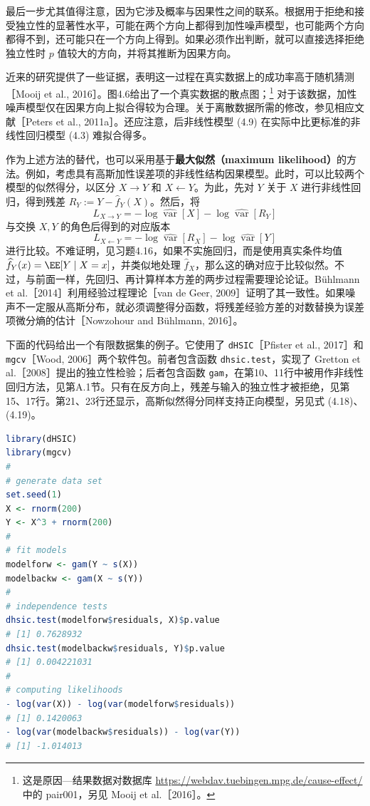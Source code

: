 最后一步尤其值得注意，因为它涉及概率与因果性之间的联系。根据用于拒绝和接受独立性的显著性水平，可能在两个方向上都得到加性噪声模型，也可能两个方向都得不到，还可能只在一个方向上得到。如果必须作出判断，就可以直接选择拒绝独立性时 $p$ 值较大的方向，并将其推断为因果方向。

近来的研究提供了一些证据，表明这一过程在真实数据上的成功率高于随机猜测［Mooij et al., 2016］。图4.6给出了一个真实数据的散点图；\footnote{这是原因—结果数据对数据库 \url{https://webdav.tuebingen.mpg.de/cause-effect/} 中的 pair001，另见 Mooij et al.［2016］。}
对于该数据，加性噪声模型仅在因果方向上拟合得较为合理。关于离散数据所需的修改，参见相应文献［Peters et al., 2011a］。还应注意，后非线性模型 (4.9) 在实际中比更标准的非线性回归模型 (4.3) 难拟合得多。



作为上述方法的替代，也可以采用基于\textbf{最大似然（maximum likelihood）}的方法。例如，考虑具有高斯加性误差项的非线性结构因果模型。此时，可以比较两个模型的似然得分，以区分 $X\to Y$ 和 $X\leftarrow Y$。为此，先对 $Y$ 关于 $X$ 进行非线性回归，得到残差 $R_Y:=Y-\widehat f_Y(X)$。然后，将
\begin{equation}
 L_{X\to Y}
 =-\log\widehat{\operatorname{var}}[X]
  -\log\widehat{\operatorname{var}}[R_Y]
 \tag{4.18}
\end{equation}
与交换 $X,Y$ 的角色后得到的对应版本
\begin{equation}
 L_{X\leftarrow Y}
 =-\log\widehat{\operatorname{var}}[R_X]
  -\log\widehat{\operatorname{var}}[Y]
 \tag{4.19}
\end{equation}
进行比较。不难证明，见习题4.16，如果不实施回归，而是使用真实条件均值 $\widehat f_Y(x)=\EE[Y\mid X=x]$，并类似地处理 $\widehat f_X$，那么这的确对应于比较似然。不过，与前面一样，先回归、再计算样本方差的两步过程需要理论论证。Bühlmann et al.［2014］利用经验过程理论［van de Geer, 2009］证明了其一致性。如果噪声不一定服从高斯分布，就必须调整得分函数，将残差经验方差的对数替换为误差项微分熵的估计［Nowzohour and Bühlmann, 2016］。

\Needspace{14cm}
\begin{codesnippet}
下面的代码给出一个有限数据集的例子。它使用了 \texttt{dHSIC}［Pfister et al., 2017］和 \texttt{mgcv}［Wood, 2006］两个软件包。前者包含函数 \texttt{dhsic.test}，实现了 Gretton et al.［2008］提出的独立性检验；后者包含函数 \texttt{gam}，在第10、11行中被用作非线性回归方法，见第A.1节。只有在反方向上，残差与输入的独立性才被拒绝，见第15、17行。第21、23行还显示，高斯似然得分同样支持正向模型，另见式 (4.18)、(4.19)。
\begin{lstlisting}[language=R]
library(dHSIC)
library(mgcv)
#
# generate data set
set.seed(1)
X <- rnorm(200)
Y <- X^3 + rnorm(200)
#
# fit models
modelforw <- gam(Y ~ s(X))
modelbackw <- gam(X ~ s(Y))
#
# independence tests
dhsic.test(modelforw$residuals, X)$p.value
# [1] 0.7628932
dhsic.test(modelbackw$residuals, Y)$p.value
# [1] 0.004221031
#
# computing likelihoods
- log(var(X)) - log(var(modelforw$residuals))
# [1] 0.1420063
- log(var(modelbackw$residuals)) - log(var(Y))
# [1] -1.014013
\end{lstlisting}
\end{codesnippet}

